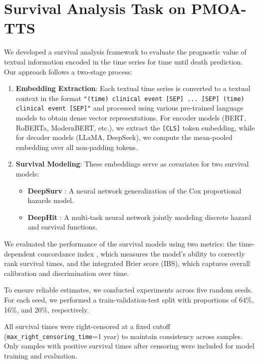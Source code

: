 \section{Survival Analysis Task on PMOA-TTS}
\label{apd:survival_analysis}

We developed a survival analysis framework to evaluate the prognostic value of textual information encoded in the time series for time until death prediction. 
Our approach follows a two-stage process:

\begin{enumerate}[leftmargin=*,topsep=0pt,itemsep=0pt]
\item \textbf{Embedding Extraction}: Each textual time series is converted to a textual context in the format \texttt{"(time) clinical event [SEP] ... [SEP] (time) clinical event [SEP]"} and processed using various pre-trained language models to obtain dense vector representations. 
For encoder models (BERT, RoBERTa, ModernBERT, etc.), we extract the \texttt{[CLS]} token embedding, while for decoder models (LLaMA, DeepSeek), we compute the mean-pooled embedding over all non-padding tokens.

\item \textbf{Survival Modeling}: These embeddings serve as covariates for two survival models:
\begin{itemize}[leftmargin=*,topsep=0pt,itemsep=0pt]
    \item \textbf{DeepSurv} \citep{katzman2018deepsurv}: A neural network generalization of the Cox proportional hazards model.
    \item \textbf{DeepHit} \citep{lee2018deephit}: A multi-task neural network jointly modeling discrete hazard and survival functions.
\end{itemize}
\end{enumerate}

We evaluated the performance of the survival models using two metrics: the time-dependent concordance index \citep{antolini2005time}, which measures the model’s ability to correctly rank survival times, and the integrated Brier score (IBS), which captures overall calibration and discrimination over time. 

To ensure reliable estimates, we conducted experiments across five random seeds.
For each seed, we performed a train-validation-test split with proportions of 64\%, 16\%, and 20\%, respectively. 

All survival times were right-censored at a fixed cutoff (\texttt{max\_right\_censoring\_time}=1 year) to maintain consistency across samples. 
Only samples with positive survival times after censoring were included for model training and evaluation.

